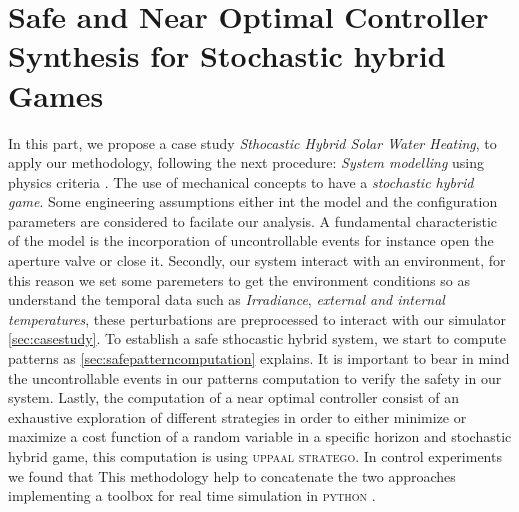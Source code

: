 \chapter{Safe and Near Optimal Controller Synthesis for Stochastic hybrid Games}
  \label{ch:proposal} %
  In this part, we propose a case study \emph{Sthocastic Hybrid Solar Water
  Heating}, to apply our methodology, following the next procedure:
  \emph{System modelling} using physics criteria \cite{tsilingiris1996solar}. The use of
  mechanical concepts to have a \emph{stochastic
  hybrid game}. Some engineering assumptions either int the model and
  the configuration parameters are considered to facilate our analysis.
  A fundamental characteristic  of the model is the incorporation 
  of uncontrollable events for instance open the aperture valve or
  close it. 
  Secondly, our system interact with an environment, for this reason 
  we set some paremeters to get the environment conditions so as 
  understand the temporal data such as \emph{Irradiance}, \emph{external and 
  internal temperatures}, these perturbations are preprocessed to interact
  with our simulator \autoref{sec:casestudy}. To establish a safe sthocastic hybrid system, we start to compute patterns as
  \autoref{sec:safepatterncomputation} explains. It is important to bear in mind
  the uncontrollable events in our patterns computation to verify the safety
  in our system.
  Lastly, the computation of a near optimal controller consist of an 
  exhaustive exploration of different strategies in order to either
  minimize or maximize a cost function of a random variable in a 
  specific horizon and stochastic hybrid game, this computation is 
  using \textsc{uppaal stratego}. In control experiments we found that
  This methodology help to concatenate the two approaches implementing
  a toolbox for real time simulation in \textsc{python} \cite{larsen2016online}.
  \clearpage

